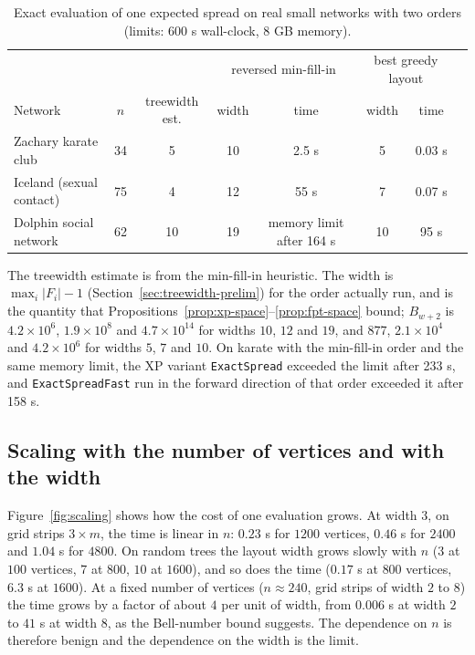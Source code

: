 \documentclass[preprint,11pt]{elsarticle}
\theoremstyle{definition}
\theoremstyle{remark}
\newcommand{\up}{\rule{0pt}{2.6ex}}
\newcommand{\down}{\rule[-1.2ex]{0pt}{0pt}}
\begin{document}
\begin{table}[h]
\centering
\caption{Exact evaluation of one expected spread on real small networks with two orders (limits: 600 s wall-clock, 8 GB memory).\label{tab:twig-feasibility}}
\small
\begin{tabular}{@{}lccccccc@{}}
\hline
\up & & & \multicolumn{2}{c}{reversed min-fill-in} & \multicolumn{2}{c}{best greedy layout} \\
Network & $n$ & treewidth est. & width & time & width & time \\
\hline
\up Zachary karate club & 34 & 5 & 10 & 2.5 s & 5 & 0.03 s \\
Iceland (sexual contact) & 75 & 4 & 12 & 55 s & 7 & 0.07 s \\
\down Dolphin social network & 62 & 10 & 19 & memory limit after 164 s & 10 & 95 s \\
\hline
\end{tabular}

\smallskip
\begin{minipage}{0.94\linewidth}
\footnotesize The treewidth estimate is from the min-fill-in heuristic. The width is $\max_i|F_i|-1$ (Section~\ref{sec:treewidth-prelim}) for the order actually run, and is the quantity that Propositions~\ref{prop:xp-space}--\ref{prop:fpt-space} bound; $B_{w+2}$ is $4.2\times10^{6}$, $1.9\times10^{8}$ and $4.7\times10^{14}$ for widths $10$, $12$ and $19$, and $877$, $2.1\times10^{4}$ and $4.2\times10^{6}$ for widths $5$, $7$ and $10$. On karate with the min-fill-in order and the same memory limit, the XP variant \texttt{ExactSpread} exceeded the limit after 233 s, and \texttt{ExactSpreadFast} run in the forward direction of that order exceeded it after 158 s.
\end{minipage}
\end{table}

\subsection{Scaling with the number of vertices and with the width}\label{sec:exp-scaling}

Figure~\ref{fig:scaling} shows how the cost of one evaluation grows. At width $3$, on grid strips $3\times m$, the time is linear in $n$: $0.23$ s for $1200$ vertices, $0.46$ s for $2400$ and $1.04$ s for $4800$. On random trees the layout width grows slowly with $n$ ($3$ at $100$ vertices, $7$ at $800$, $10$ at $1600$), and so does the time ($0.17$ s at $800$ vertices, $6.3$ s at $1600$). At a fixed number of vertices ($n\approx240$, grid strips of width $2$ to $8$) the time grows by a factor of about $4$ per unit of width, from $0.006$ s at width $2$ to $41$ s at width $8$, as the Bell-number bound suggests. The dependence on $n$ is therefore benign and the dependence on the width is the limit.
\end{document}
